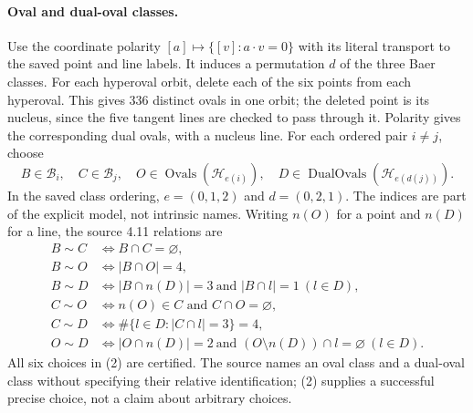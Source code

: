 \documentclass[11pt]{article}
\newcommand{\orb}{\mathcal B}\newcommand{\hyp}{\mathcal H}
\begin{document}
\paragraph{Oval and dual-oval classes.}
Use the coordinate polarity $[a]\mapsto\{[v]:a\cdot v=0\}$ with its
literal transport to the saved point and line labels. It induces a permutation
$d$ of the three Baer classes. For each hyperoval orbit, delete each of the
six points from each hyperoval. This gives 336 distinct ovals in one orbit;
the deleted point is its nucleus, since the five tangent lines are checked
to pass through it. Polarity gives the corresponding dual ovals, with a
nucleus line. For each ordered pair $i\ne j$, choose
\[
 B\in\orb_i,\quad C\in\orb_j,\quad
 O\in\operatorname{Ovals}(\hyp_{e(i)}),\quad
 D\in\operatorname{DualOvals}(\hyp_{e(d(j))}).             \tag{2}
\]
In the saved class ordering, $e=(0,1,2)$ and $d=(0,2,1)$.
The indices are part of the explicit model, not intrinsic names.
Writing $n(O)$ for a point and $n(D)$ for a line, the source 4.11 relations are
\begin{align*}
 B\sim C&\iff B\cap C=\varnothing,\\
 B\sim O&\iff |B\cap O|=4,\\
 B\sim D&\iff |B\cap n(D)|=3\ \text{and }|B\cap l|=1\ (l\in D),\\
 C\sim O&\iff n(O)\in C\text{ and }C\cap O=\varnothing,\\
 C\sim D&\iff \#\{l\in D:|C\cap l|=3\}=4,\\
 O\sim D&\iff |O\cap n(D)|=2\ \text{and }(O\setminus n(D))\cap l=\varnothing\ (l\in D).
\end{align*}
All six choices in (2) are certified. The source names an oval class and
a dual-oval class without specifying their relative identification; (2)
supplies a successful precise choice, not a claim about arbitrary choices.
\end{document}
